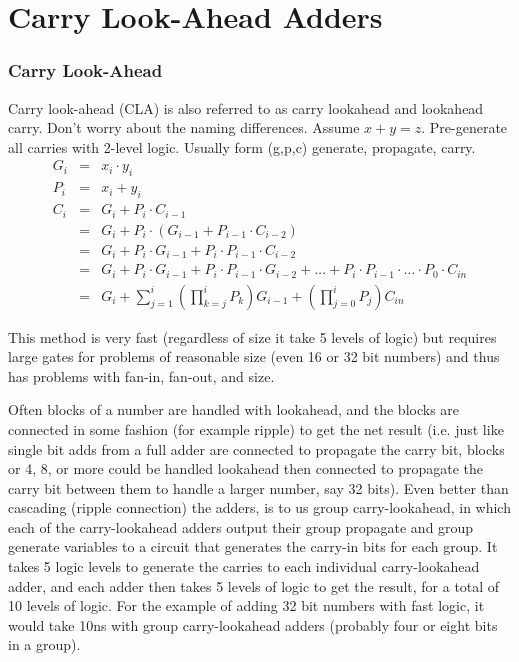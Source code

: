 \chapter{Carry Look-Ahead Adders}




\subsection{Carry Look-Ahead}

Carry look-ahead (CLA) is also referred to as carry lookahead and lookahead carry.  Don't worry about the naming differences.  Assume $x+y=z$.  Pre-generate all carries with 2-level logic. Usually form (g,p,c) generate, propagate, carry.
\begin{eqnarray}
G_i & = & x_i \cdot y_i \label{eq-generate}\\
P_i & = & x_i + y_i \label{eq-propagate}\\
C_i & = & G_i + P_i \cdot C_{i-1} \\
    & = & G_i + P_i \cdot (G_{i-1} + P_{i-1} \cdot C_{i-2}) \\
    & = & G_i + P_i \cdot G_{i-1} + P_i \cdot P_{i-1} \cdot C_{i-2} \\
    & = & G_i + P_i \cdot G_{i-1} + P_i \cdot P_{i-1} \cdot G_{i-2} +
    \ldots + P_i \cdot P_{i-1} \cdot \ldots \cdot P_0 \cdot C_{in}\\
    &=& G_i + \sum_{j=1}^i\left(\prod_{k=j}^{i} P_k \right)G_{i-1} + \left(\prod_{j=0}^{i} P_j\right) C_{in} \label{eq-carry}
\end{eqnarray}

This method is very fast (regardless of size it take 5 levels of logic) but requires large gates for problems of reasonable size (even 16 or 32 bit numbers) and thus has problems with fan-in, fan-out, and size.

Often blocks of a number are handled with lookahead, and the blocks are connected in some fashion (for example ripple) to get the net result (i.e. just like single bit adds from a full adder are connected to propagate the carry bit, blocks or 4, 8, or more could be handled lookahead then connected to propagate the carry bit between them to handle a larger number, say 32 bits).  Even better than cascading (ripple connection) the adders, is to us group carry-lookahead, in which each of the carry-lookahead adders output their group propagate and group generate variables to a circuit that generates the carry-in bits for each group.  It takes 5 logic levels to generate the carries to each individual carry-lookahead adder, and each adder then takes 5 levels of logic to get the result, for a total of 10 levels of logic.  For the example of adding 32 bit numbers with fast logic, it would take 10ns with group carry-lookahead adders (probably four or eight bits in a group).



